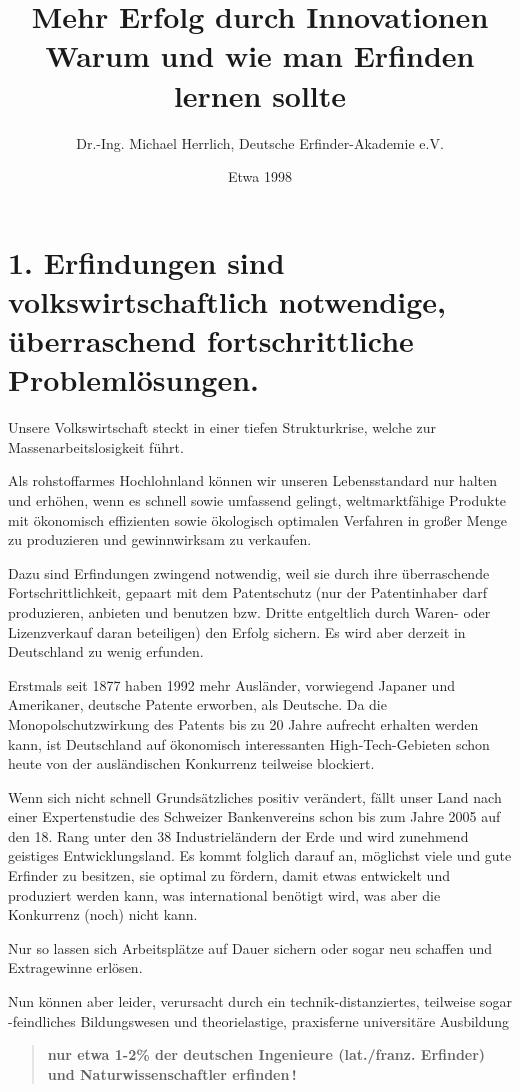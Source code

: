\documentclass[11pt,a4paper]{article}
\title{Mehr Erfolg durch Innovationen\\\Large Warum und wie man Erfinden
  lernen sollte}
\author{Dr.-Ing. Michael Herrlich, Deutsche Erfinder-Akademie e.V.}
\date{Etwa 1998}
\begin{document}
\maketitle

\section*{1. Erfindungen sind volkswirtschaftlich notwendige,\\ überraschend  
  fortschrittliche Problemlösungen.}

Unsere Volkswirtschaft steckt in einer tiefen Strukturkrise, welche zur
Massenarbeitslosigkeit führt.

Als rohstoffarmes Hochlohnland können wir unseren Lebensstandard nur halten
und erhöhen, wenn es schnell sowie umfassend gelingt, weltmarktfähige Produkte
mit ökonomisch effizienten sowie ökologisch optimalen Verfahren in großer
Menge zu produzieren und gewinnwirksam zu verkaufen.  

Dazu sind Erfindungen zwingend notwendig, weil sie durch ihre überraschende
Fortschrittlichkeit, gepaart mit dem Patentschutz (nur der Patentinhaber darf
produzieren, anbieten und benutzen bzw. Dritte entgeltlich durch Waren- oder
Lizenzverkauf daran beteiligen) den Erfolg sichern. Es wird aber derzeit in
Deutschland zu wenig erfunden.

Erstmals seit 1877 haben 1992 mehr Ausländer, vorwiegend Japaner und
Amerikaner, deutsche Patente erworben, als Deutsche.  Da die
Monopolschutzwirkung des Patents bis zu 20 Jahre aufrecht erhalten werden
kann, ist Deutschland auf ökonomisch interessanten High-Tech-Gebieten schon
heute von der ausländischen Konkurrenz teilweise blockiert.

Wenn sich nicht schnell Grundsätzliches positiv verändert, fällt unser Land
nach einer Expertenstudie des Schweizer Bankenvereins schon bis zum Jahre 2005
auf den 18. Rang unter den 38 Industrieländern der Erde und wird zunehmend
geistiges Entwicklungsland.  Es kommt folglich darauf an, möglichst viele und
gute Erfinder zu besitzen, sie optimal zu fördern, damit etwas entwickelt und
produziert werden kann, was international benötigt wird, was aber die
Konkurrenz (noch) nicht kann.

Nur so lassen sich Arbeitsplätze auf Dauer sichern oder sogar neu schaffen und
Extragewinne erlösen. 

Nun können aber leider, verursacht durch ein technik-distanziertes, teilweise
sogar -feindliches Bildungswesen und theorielastige, praxisferne universitäre
Ausbildung 
\begin{quote}\bf
  nur etwa 1-2\% der deutschen Ingenieure (lat./franz. Erfinder) und
  Naturwissenschaftler erfinden\,!
\end{quote}
\end{document}
